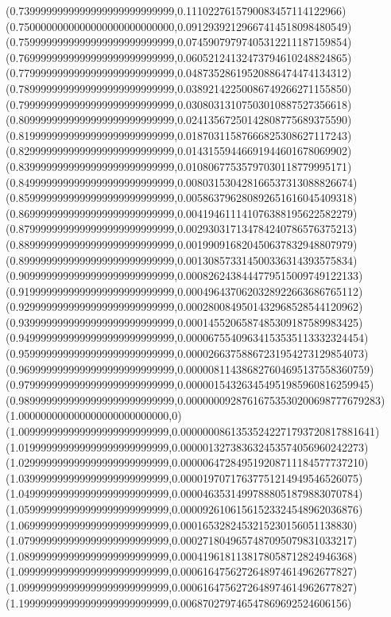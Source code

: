 \documentclass[11pt]{report}
\begin{document}
\begin{center}
  (0.7399999999999999999999999999,0.1110227615790083457114122966)
  (0.7500000000000000000000000000,0.09129392129667414518098480549)
  (0.7599999999999999999999999999,0.07459079797405312211187159854)
  (0.7699999999999999999999999999,0.06052124132473794610248824865)
  (0.7799999999999999999999999999,0.04873528619520886474474134312)
  (0.7899999999999999999999999999,0.03892142250086749266271155850)
  (0.7999999999999999999999999999,0.03080313107503010887527356618)
  (0.8099999999999999999999999999,0.02413567250142808775689375590)
  (0.8199999999999999999999999999,0.01870311587666825308627117243)
  (0.8299999999999999999999999999,0.01431559446691944601678069902)
  (0.8399999999999999999999999999,0.01080677535797030118779995171)
  (0.8499999999999999999999999999,0.008031530428166537313088826674)
  (0.8599999999999999999999999999,0.005863796280892651616045409318)
  (0.8699999999999999999999999999,0.004194611141076388195622582279)
  (0.8799999999999999999999999999,0.002930317134784240786576375213)
  (0.8899999999999999999999999999,0.001990916820450637832948807979)
  (0.8999999999999999999999999999,0.001308573314500336314393575834)
  (0.9099999999999999999999999999,0.0008262438444779515009749122133)
  (0.9199999999999999999999999999,0.0004964370620328922663686765112)
  (0.9299999999999999999999999999,0.0002800849501432968528544120962)
  (0.9399999999999999999999999999,0.0001455206587485309187589983425)
  (0.9499999999999999999999999999,0.00006755409634153535113332324454)
  (0.9599999999999999999999999999,0.00002663758867231954273129854073)
  (0.9699999999999999999999999999,0.000008114386827604695137558360759)
  (0.9799999999999999999999999999,0.000001543263454951985960816259945)
  (0.9899999999999999999999999999,0.00000009287616753530200698777679283)
  (1.000000000000000000000000000,0)
  (1.009999999999999999999999999,0.00000008613535242271793720817881641)
  (1.019999999999999999999999999,0.000001327383632453574056960242273)
  (1.029999999999999999999999999,0.000006472849519208711184577737210)
  (1.039999999999999999999999999,0.00001970717637751214949546526075)
  (1.049999999999999999999999999,0.00004635314997888051879883070784)
  (1.059999999999999999999999999,0.00009261061561523324548962036876)
  (1.069999999999999999999999999,0.0001653282453215230156051138830)
  (1.079999999999999999999999999,0.0002718049657487095079831033217)
  (1.089999999999999999999999999,0.0004196181138178058712824946368)
  (1.099999999999999999999999999,0.0006164756272648974614962677827)
  (1.099999999999999999999999999,0.0006164756272648974614962677827)
  (1.199999999999999999999999999,0.006870279746547869692524606156)

\end{center}
\end{document}
